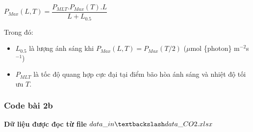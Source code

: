 \documentclass[a4paper]{article}
\begin{document}
    \begin{center}
        $P_{Max}(L, T) = \dfrac{P_{MLT}.P_{Max}(T).L}{L + L_{0.5}}$
    \end{center}
    Trong đó:
    \begin{itemize}
        \item $L_{0.5}$ là lượng ánh sáng khi $P_{Max}(L,T) = P_{Max}(T/2)$ ($\mu$mol \{photon\} m$^{-2}$s$^{-1}$)
        \item $P_{MLT}$ là tốc độ quang hợp cực đại tại điểm bão hòa ánh sáng và nhiệt độ tối ưu $T$.
    \end{itemize}
\subsubsection{Code bài 2b}
\textbf{Dữ liệu được đọc từ file $data\_in\textbackslash data\_CO2.xlsx$} \\
\end{document}

